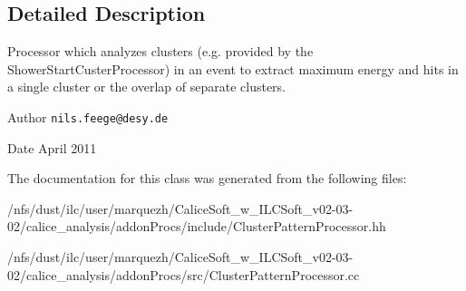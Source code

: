 \subsection{Detailed Description}
Processor which analyzes clusters (e.\-g. provided by the Shower\-Start\-Custer\-Processor) in an event to extract maximum energy and hits in a single cluster or the overlap of separate clusters.

\begin{DoxyAuthor}{Author}
{\tt nils.\-feege@desy.\-de} 
\end{DoxyAuthor}
\begin{DoxyDate}{Date}
April 2011 
\end{DoxyDate}


The documentation for this class was generated from the following files\-:\begin{DoxyCompactItemize}
\item 
/nfs/dust/ilc/user/marquezh/\-Calice\-Soft\-\_\-w\-\_\-\-I\-L\-C\-Soft\-\_\-v02-\/03-\/02/calice\-\_\-analysis/addon\-Procs/include/Cluster\-Pattern\-Processor.\-hh\item 
/nfs/dust/ilc/user/marquezh/\-Calice\-Soft\-\_\-w\-\_\-\-I\-L\-C\-Soft\-\_\-v02-\/03-\/02/calice\-\_\-analysis/addon\-Procs/src/Cluster\-Pattern\-Processor.\-cc\end{DoxyCompactItemize}
